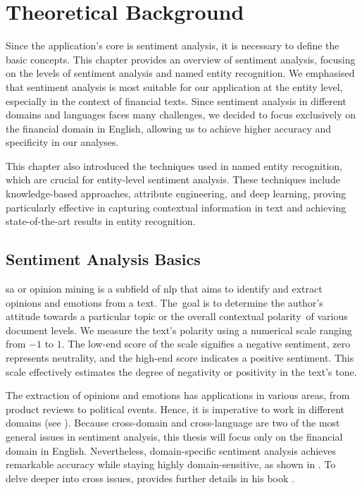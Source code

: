 \chapter{Theoretical Background}
\label{chap:theoretical-background}
Since the application's core is sentiment analysis, it is necessary to define the basic concepts. This chapter provides an overview of sentiment analysis, focusing on the levels of sentiment analysis and named entity recognition. We emphasised that sentiment analysis is most suitable for our application at the entity level, especially in the context of financial texts. Since sentiment analysis in different domains and languages faces many challenges, we decided to focus exclusively on the financial domain in English, allowing us to achieve higher accuracy and specificity in our analyses. 

This chapter also introduced the techniques used in named entity recognition, which are crucial for entity-level sentiment analysis. These techniques include knowledge-based approaches, attribute engineering, and deep learning, proving particularly effective in capturing contextual information in text and achieving state-of-the-art results in entity recognition.

\section{Sentiment Analysis Basics}
\label{sec:sentiment-analysis-basics}
\acrfull{sa} or opinion mining is a subfield of \acrfull{nlp} that aims to identify and extract opinions and emotions from a text. The~goal is to determine the author's attitude towards a particular topic or the overall contextual polarity~of various document levels. We measure the text's polarity using a numerical scale ranging from $-1$ to $1$. The low-end score of the scale signifies a negative sentiment, zero represents neutrality, and the high-end score indicates a positive sentiment. This scale effectively estimates the degree of negativity or positivity in the text's tone. 

The extraction of opinions and emotions has applications in various areas, from product reviews to political events. Hence, it is imperative to work in different domains (see \cite{PIRYANI2017122}). Because cross-domain and cross-language are two of the most general issues in sentiment analysis, this thesis will focus only on the financial domain in English. Nevertheless, domain-specific sentiment analysis achieves remarkable accuracy while staying highly domain-sensitive, as shown in \parencite{saunders_2020}. To delve deeper into cross issues, \citeauthor{liu2022sentiment} provides further details in his book \parencite{liu2022sentiment}.

